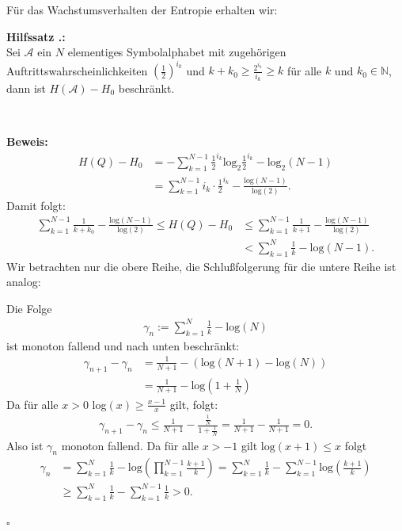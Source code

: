 \documentclass[a4paper,12pt]{article}
\newcommand{\N}{\mathbb N}
\newcommand{\A}{\mathcal A}
\newcounter{Hilfssatz}
\newenvironment{Hilfssatz}{
\medskip
        
        \setlength{\parindent}{0pt}
        \addtocounter{Hilfssatz}{1}
        \textbf{\textsf{Hilfssatz \thesubsection.\theHilfssatz}:}\\}{
        \nopagebreak
        \vspace{-1.0ex}
        \bigskip\\
        
}
\newenvironment{proof}{
\bigskip
        
        \setlength{\parindent}{0pt}
        \textbf{Beweis:}\\}{
        \nopagebreak
        \vspace{-1.0ex}
        \begin{flushright}
             $\square$
        \end{flushright}
        \bigskip
        
}
\begin{document}
\newpage
Für das Wachstumsverhalten der Entropie erhalten wir:
\begin{Hilfssatz}
Sei $\A$ ein $N$ elementiges Symbolalphabet mit zugehörigen Auftrittswahrscheinlichkeiten $\left(\frac{1}{2}\right)^{i_{k}}$ und $k+k_{0}\geq\frac{2^{i_k}}{i_k} \geq k$ für alle $k$ und $k_{0}\in\N$, dann ist $H(\A)-H_{0}$ beschränkt.
\end{Hilfssatz}
\begin{proof}
\begin{align*}
H(Q) - H_{0} &=-\sum_{k=1}^{N-1}\frac{1}{2}^{i_{k}} \text{log}_{2}\frac{1}{2}^{i_{k}} - \text{log}_{2}(N-1)
\\
 & = \sum_{k=1}^{N-1}i_{k}\cdot \frac{1}{2}^{i_{k}} - \frac{\text{log}(N-1)}{\text{log}(2)}.
\end{align*}
Damit folgt:
\begin{align*}
\sum_{k=1}^{N-1}\frac{1}{k+k_{0}} - \frac{\text{log}(N-1)}{\text{log}(2)} \leq H(Q) - H_{0} &\leq \sum_{k=1}^{N-1} \frac{1}{k+1} - \frac{\text{log}(N-1)}{\text{log}(2)}
\\
& <  \sum_{k=1}^{N} \frac{1}{k} - \text{log}(N-1) .
\end{align*}
Wir betrachten nur die obere Reihe, die Schlußfolgerung für die untere Reihe ist analog:
\par
Die Folge 
\begin{align*}
\gamma_{n}:= \sum_{k=1}^{N} \frac{1}{k} - \text{log}(N) 
\end{align*}
ist monoton fallend und nach unten beschränkt:
\begin{align*}
\gamma_{n+1}-\gamma_{n} &= \frac{1}{N+1} - \left(\text{log}(N+1) - \text{log}(N)\right) 
\\
& = \frac{1}{N+1} - \text{log}\left(1+\frac{1}{N}\right)
\end{align*}
Da für alle $x > 0$ log$(x) \geq \frac{x-1}{x}$ gilt, folgt:
\begin{align*}
\gamma_{n+1}-\gamma_{n} \leq \frac{1}{N+1} - \frac{\frac{1}{N}}{1+\frac{1}{N}} = \frac{1}{N+1} - \frac{1}{N+1} = 0.
\end{align*}
Also ist $\gamma_n$ monoton fallend.
Da für alle $x>-1$ gilt $\text{log}(x+1)\leq x$ folgt
\begin{align*}
\gamma_{n} &= \sum_{k=1}^{N}\frac{1}{k} -\text{log}\left(\prod_{k=1}^{N-1}\frac{k+1}{k}\right) = \sum_{k=1}^{N}\frac{1}{k} - \sum_{k=1}^{N-1}\text{log}\left(\frac{k+1}{k}\right) 
\\
&\geq \sum_{k=1}^{N}\frac{1}{k} -  \sum_{k=1}^{N-1}\frac{1}{k} > 0.
\end{align*}
\end{proof}
\end{document}
